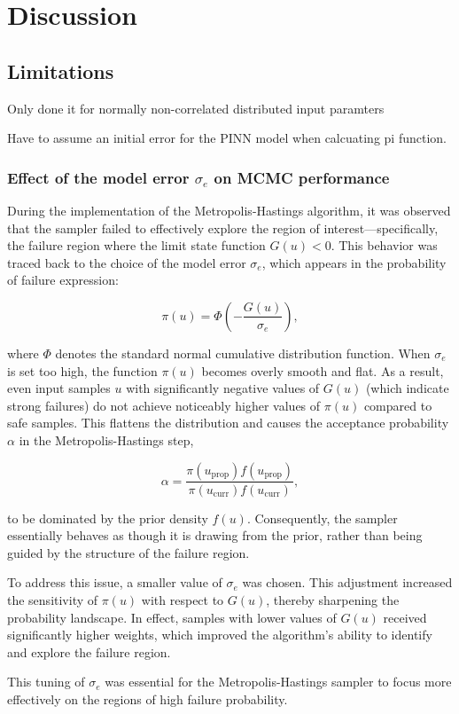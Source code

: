 \chapter{Discussion}
\label{ch:discussion}

\section{Limitations}
Only done it for normally non-correlated distributed input paramters 

Have to assume an initial error for the PINN model when calcuating pi function. 

\subsection*{Effect of the model error \texorpdfstring{$\sigma_e$}{sigma\_e} on MCMC performance}

During the implementation of the Metropolis-Hastings algorithm, it was observed that the sampler failed to effectively explore the region of interest—specifically, the failure region where the limit state function $G(u) < 0$. This behavior was traced back to the choice of the model error $\sigma_e$, which appears in the probability of failure expression:

\[
\pi(u) = \Phi\left(-\frac{G(u)}{\sigma_e}\right),
\]

where $\Phi$ denotes the standard normal cumulative distribution function. When $\sigma_e$ is set too high, the function $\pi(u)$ becomes overly smooth and flat. As a result, even input samples $u$ with significantly negative values of $G(u)$ (which indicate strong failures) do not achieve noticeably higher values of $\pi(u)$ compared to safe samples. This flattens the distribution and causes the acceptance probability $\alpha$ in the Metropolis-Hastings step,

\[
\alpha = \frac{\pi(u_{\text{prop}}) f(u_{\text{prop}})}{\pi(u_{\text{curr}}) f(u_{\text{curr}})},
\]

to be dominated by the prior density $f(u)$. Consequently, the sampler essentially behaves as though it is drawing from the prior, rather than being guided by the structure of the failure region.

To address this issue, a smaller value of $\sigma_e$ was chosen. This adjustment increased the sensitivity of $\pi(u)$ with respect to $G(u)$, thereby sharpening the probability landscape. In effect, samples with lower values of $G(u)$ received significantly higher weights, which improved the algorithm's ability to identify and explore the failure region.

This tuning of $\sigma_e$ was essential for the Metropolis-Hastings sampler to focus more effectively on the regions of high failure probability.
